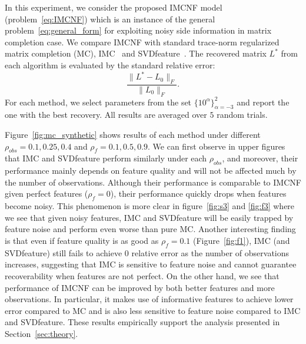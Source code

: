 \documentclass[twoside,11pt]{article}
\def\realL{L_0}
\def\optL{L^*}
\begin{document}
In this experiment, we consider the proposed IMCNF model (problem~\ref{eq:IMCNF}) which is
an instance of the general problem~\eqref{eq:general_form} for exploiting
noisy side information in matrix completion case.
We compare IMCNF with standard trace-norm regularized matrix completion (MC),
IMC~\citep{Jain13b} and SVDfeature~\citep{Chen12a}.
The recovered matrix $\optL$ from
each algorithm is evaluated by the standard relative error:
\begin{equation}
  \label{eq:relative_error}
  \frac{\|L^*-\realL\|_F}{\|\realL\|_F}.
\end{equation}
For each method, we select parameters from the set $\{10^\alpha\}_{\alpha=-3}^2$
and report the one with the best recovery.
All results are averaged over $5$ random trials.

Figure~\ref{fig:mc_synthetic} shows results of each method under
different $\rho_{obs} = 0.1, 0.25, 0.4$ and $\rho_f = 0.1, 0.5, 0.9$.
We can first observe in upper figures that IMC and SVDfeature perform similarly under each
$\rho_{obs}$,
and moreover, their performance
mainly depends on feature quality and will not be affected much by
the number of observations.
Although their performance is comparable
to IMCNF given perfect features ($\rho_f = 0$), their performance quickly drops
when features become noisy.  This phenomenon is more clear in
figure~\ref{fig:s3} and \ref{fig:f3} where we see that given noisy features,
IMC and SVDfeature will be easily trapped by feature noise and perform even worse than pure MC.
Another interesting finding is that even if feature quality is as good as $\rho_f = 0.1$
(Figure~\ref{fig:f1}),
IMC (and SVDfeature) still fails to achieve $0$ relative error as
the number of observations increases,
suggesting that IMC is sensitive to feature noise and cannot guarantee recoverability when features are not perfect.
On the other hand, we see that performance of IMCNF can be improved by both better features and
more observations. %
In particular, it makes use of informative features to achieve lower error compared to
MC and is also less sensitive to feature noise compared to IMC and SVDfeature.  These results
empirically support the analysis presented in Section~\ref{sec:theory}.
\end{document}
